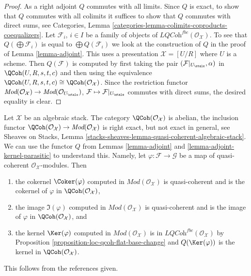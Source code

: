 \begin{proof}
\medskip\noindent
As a right adjoint $Q$ commutes with all limits. Since $Q$ is exact, to
show that $Q$ commutes with all colimits it suffices to show that $Q$
commutes with direct sums, see
Categories, Lemma \ref{categories-lemma-colimits-coproducts-coequalizers}.
Let $\mathcal{F}_i$, $i \in I$ be a family of objects of
$\textit{LQCoh}^{fbc}(\mathcal{O}_\mathcal{X})$. To see that
$Q(\bigoplus \mathcal{F}_i)$ is equal to $\bigoplus Q(\mathcal{F}_i)$
we look at the construction of $Q$ in the proof of
Lemma \ref{lemma-adjoint}. This uses a presentation $\mathcal{X} = [U/R]$
where $U$ is a scheme. Then $Q(\mathcal{F})$
is computed by first taking the pair
$(\mathcal{F}|_{U_\etale}, \alpha)$ in $\QCoh(U, R, s, t, c)$
and then using the equivalence
$\QCoh(U, R, s, t, c) \cong \QCoh(\mathcal{O}_\mathcal{X})$.
Since the restriction functor $\textit{Mod}(\mathcal{O}_\mathcal{X}) \to
\textit{Mod}(\mathcal{O}_{U_\etale})$,
$\mathcal{F} \mapsto \mathcal{F}|_{U_\etale}$ commutes with
direct sums, the desired equality is clear.
\end{proof}

\begin{remark}
\label{remark-QCoh-abelian}
Let $\mathcal{X}$ be an algebraic stack. The category
$\QCoh(\mathcal{O}_\mathcal{X})$ is abelian, the inclusion functor
$\QCoh(\mathcal{O}_\mathcal{X}) \to \textit{Mod}(\mathcal{O}_\mathcal{X})$
is right exact, but not exact in general, see Sheaves on Stacks, Lemma
\ref{stacks-sheaves-lemma-quasi-coherent-algebraic-stack}.
We can use the functor $Q$ from
Lemmas \ref{lemma-adjoint} and \ref{lemma-adjoint-kernel-parasitic}
to understand this. Namely, let $\varphi : \mathcal{F} \to \mathcal{G}$
be a map of quasi-coherent $\mathcal{O}_\mathcal{X}$-modules. Then
\begin{enumerate}
\item the cokernel $\Coker(\varphi)$ computed in
$\textit{Mod}(\mathcal{O}_\mathcal{X})$ is quasi-coherent and
is the cokernel of $\varphi$ in $\QCoh(\mathcal{O}_\mathcal{X})$,
\item the image $\Im(\varphi)$ computed in
$\textit{Mod}(\mathcal{O}_\mathcal{X})$ is quasi-coherent and
is the image of $\varphi$ in $\QCoh(\mathcal{O}_\mathcal{X})$, and
\item the kernel $\Ker(\varphi)$ computed in
$\textit{Mod}(\mathcal{O}_\mathcal{X})$
is in $\textit{LQCoh}^{fbc}(\mathcal{O}_\mathcal{X})$
by Proposition \ref{proposition-loc-qcoh-flat-base-change} and
$Q(\Ker(\varphi))$ is the kernel in $\QCoh(\mathcal{O}_\mathcal{X})$.
\end{enumerate}
This follows from the references given.
\end{remark}

